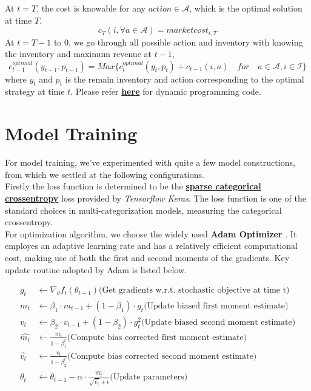 \documentclass[12pt]{extarticle}
\begin{document}
\noindent At $t = T$, the cost is knowable for any $action\in \mathscr{A}$, which is the optimal solution at time $T$.
$$c_T(i,\forall a \in \mathscr{A}) = market cost_{i,T}$$
At $t = T-1$ to $0$, we go through all possible action and inventory with knowing the inventory and maximum revenue at $t-1$,
$$c_{t-1}^{optimal}(y_{t-1},p_{t-1}) = Max\{c_{t}^{optimal}(y_t,p_t) + c_{t-1}(i,a) \quad for \quad a\in \mathscr{A}, i \in \mathscr{I}\}$$
where $y_t$ and $p_t$ is the remain inventory and action corresponding to the optimal strategy at time $t$.
Please refer \href{https://github.com/wangkunzhen/Machine-Learning-5225/blob/master/OptimizationEngine.py}{\textbf{here}} for dynamic programming code.




\section{Model Training}
For model training, we've experimented with quite a few model constructions, from which
we settled at the following configurations.\\


\noindent Firstly the loss function is determined to be the
\href{https://github.com/tensorflow/tensorflow/blob/r1.13/tensorflow/python/keras/backend.py}{\textbf{sparse categorical crossentropy}}
loss provided by \textit{Tensorflow Keras}. The loss function is one of the standard
choices in multi-categorization models, measuring the categorical crossentropy. \\


\noindent For optimization algorithm, we choose the widely used \textbf{Adam Optimizer} \cite{adam}.
It employes an adaptive learning rate and has a relatively efficient computational cost,
making use of both the first and second moments of the gradients. Key update routine
adopted by Adam is listed below.

\begin{equation*}
  \begin{split}
    g_t &\leftarrow \nabla_{\theta} f_t (\theta_{t-1}) \text{(Get gradients w.r.t. stochastic objective at time t)} \\
    m_t &\leftarrow \beta_1 \cdot m_{t-1} + (1-\beta_1) \cdot g_t \text{(Update biased first moment estimate)} \\
    v_t &\leftarrow \beta_2 \cdot v_{t-1} + (1-\beta_2) \cdot g_t^2 \text{(Update biased second moment estimate)} \\
    \hat{m_{t}} &\leftarrow \frac{m_t}{1 - \beta_1^t} \text{(Compute bias corrected first moment estimate)} \\
    \hat{v_{t}} &\leftarrow \frac{v_t}{1 - \beta_2^t} \text{(Compute bias corrected second moment estimate)} \\
    \theta_t &\leftarrow \theta_{t-1} - \alpha \cdot \frac{\hat{m_t}}{\sqrt{\hat{v_t}} + \epsilon} \text{(Update parameters)}
  \end{split}
\end{equation*}
\end{document}
